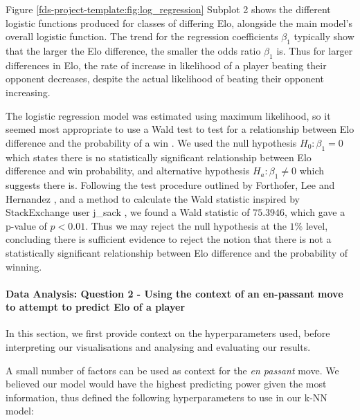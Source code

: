 \documentclass[10pt,a4paper]{article}
\begin{document}
\begin{multicols}{2}
Figure \ref{fds-project-template:fig:log_regression} Subplot 2 shows the different logistic functions produced for classes of differing Elo, alongside the main model's overall logistic function. The trend for the regression coefficients $\beta_{1}$ typically show that the larger the Elo difference, the smaller the odds ratio $\beta_{1}$ is. Thus for larger differences in Elo, the rate of increase in likelihood of a player beating their opponent decreases, despite the actual likelihood of beating their opponent increasing. \newline

The logistic regression model was estimated using maximum likelihood, so it seemed most appropriate to use a Wald test to test for a relationship between Elo difference and the probability of a win \cite{WaldTest}. We used the null hypothesis $H_{0}: \beta_{1} = 0$ which states there is no statistically significant relationship between Elo difference and win probability, and alternative hypothesis $H_{a}: \beta_{1} \neq 0$ which suggests there is. Following the test procedure outlined by Forthofer, Lee and Hernandez \cite{WaldTest}, and a method to calculate the Wald statistic inspired by StackExchange user j\_sack \cite{StackExchangeWaldTest}, we found a Wald statistic of $75.3946$, which gave a p-value of $p<0.01$. Thus we may reject the null hypothesis at the $1\%$ level, concluding there is sufficient evidence to reject the notion that there is not a statistically significant relationship between Elo difference and the probability of winning. \newline

\paragraph{Data Analysis: Question 2 - Using the context of an en-passant move to attempt to predict Elo of a player}

In this section, we first provide context on the hyperparameters used, before interpreting our visualisations and analysing and evaluating our results. \newline

A small number of factors can be used as context for the \textit{en passant} move. We believed our model would have the highest predicting power given the most information, thus defined the following hyperparameters to use in our k-NN model:


\end{multicols}
\end{document}
